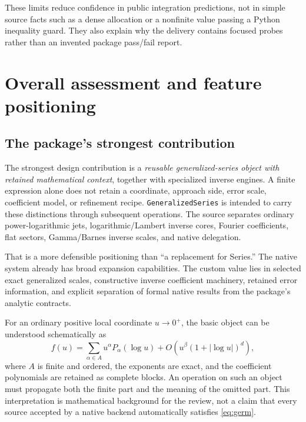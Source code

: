 \documentclass[11pt,letterpaper]{article}
\newcommand{\code}[1]{\nolinkurl{#1}}
\begin{document}
These limits reduce confidence in public integration predictions, not in
simple source facts such as a dense allocation or a nonfinite value passing
a Python inequality guard. They also explain why the delivery contains
focused probes rather than an invented package pass/fail report.

\section{Overall assessment and feature positioning}
\label{sec:assessment}

\subsection{The package's strongest contribution}
The strongest design contribution is a \emph{reusable generalized-series
object with retained mathematical context}, together with specialized
inverse engines. A finite expression alone does not retain a coordinate,
approach side, error scale, coefficient model, or refinement recipe.
\code{GeneralizedSeries} is intended to carry these distinctions through
subsequent operations. The source separates ordinary power-logarithmic
jets, logarithmic/Lambert inverse cores, Fourier coefficients, flat sectors,
Gamma/Barnes inverse scales, and native delegation.
\cite{repo-core,repo-lambert,repo-fourier,repo-gamma,repo-native}

That is a more defensible positioning than ``a replacement for Series.''
The native system already has broad expansion capabilities. The custom
value lies in selected exact generalized scales, constructive inverse
coefficient machinery, retained error information, and explicit separation
of formal native results from the package's analytic contracts.

For an ordinary positive local coordinate $u\to0^+$, the basic object can
be understood schematically as
\begin{equation}
 f(u)=\sum_{\alpha\in A}u^\alpha P_\alpha(\log u)
       +O\!\left(u^\beta(1+|\log u|)^d\right),
 \label{eq:germ}
\end{equation}
where $A$ is finite and ordered, the exponents are exact, and the coefficient
polynomials are retained as complete blocks. An operation on such an object
must propagate both the finite part and the meaning of the omitted part.
This interpretation is mathematical background for the review, not a claim
that every source accepted by a native backend automatically satisfies
\eqref{eq:germ}.
\end{document}

